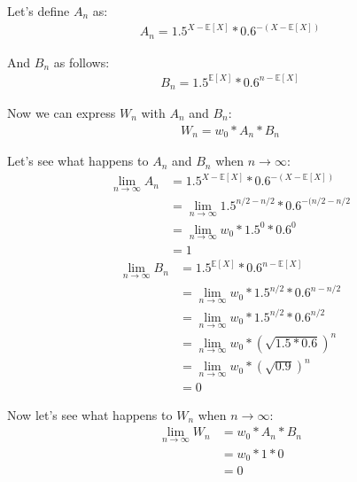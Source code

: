 \documentclass[12pt]{article}
\begin{document}
Let's define $A_n$ as:
\begin{align}
  \begin{equation*}
    A_n = 1.5^{X - \mathbb{E}[X]} * 0.6^{-(X - \mathbb{E}[X])}
  \end{equation*}
\end{align}

And $B_n$ as follows:
\begin{align}
  \begin{equation*}
    B_n = 1.5^{\mathbb{E}[X]} * 0.6^{n - \mathbb{E}[X]}
  \end{equation*}
\end{align}

Now we can express $W_n$ with $A_n$ and $B_n$:
\begin{align}
  \begin{equation*}
    W_n = w_0 * A_n * B_n
  \end{equation*}
\end{align}

Let's see what happens to $A_n$ and $B_n$ when $n \rightarrow \infty$:
\begin{equation*}
  \begin{split}
    \lim_{n\to\infty} A_n &=  1.5^{X - \mathbb{E}[X]} * 0.6^{-(X - \mathbb{E}[X])}\\
    &= \lim_{n\to\infty} 1.5^{n/2 - n/2} * 0.6^{- (n/2 - n/2} \\
    &= \lim_{n\to\infty}w_0 * 1.5^0 * 0.6^0 \\
    & = 1
  \end{split}
\end{equation*}
\begin{equation*}
  \begin{split}
    \lim_{n\to\infty} B_n &=  1.5^{\mathbb{E}[X]} * 0.6^{n - \mathbb{E}[X]} \\
    &= \lim_{n\to\infty}w_0 * 1.5^{n/2} * 0.6^{n - n/2} \\
    &= \lim_{n\to\infty}w_0 * 1.5^{n/2} * 0.6^{n/2} \\
    &= \lim_{n\to\infty}w_0 * (\sqrt{1.5*0.6})^{n}\\
    &= \lim_{n\to\infty}w_0 * (\sqrt{0.9}) ^{n}\\
    &= 0
  \end{split}
\end{equation*}

Now let's see what happens to $W_n$ when $n \rightarrow \infty$:
\begin{equation*}
  \begin{split}
    \lim_{n\to\infty} W_n &= w_0 * A_n * B_n\\
    & = w_0 * 1 * 0 \\
    & = 0
  \end{split}
\end{equation*}
\end{document}
